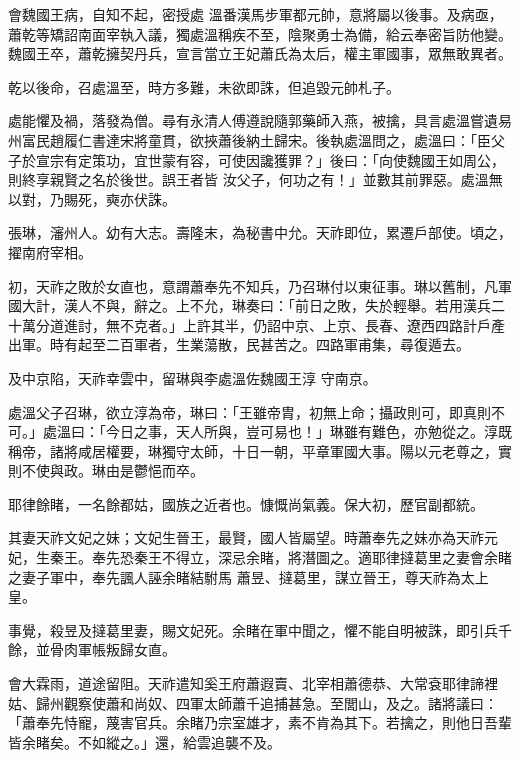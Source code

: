 \begin{pinyinscope}
 會魏國王病，自知不起，密授處
 溫番漢馬步軍都元帥，意將屬以後事。及病亟，蕭乾等矯詔南面宰執入議，獨處溫稱疾不至，陰聚勇士為備，給云奉密旨防他變。魏國王卒，蕭乾擁契丹兵，宣言當立王妃蕭氏為太后，權主軍國事，眾無敢異者。



 乾以後命，召處溫至，時方多難，未欲即誅，但追毀元帥札子。



 處能懼及禍，落發為僧。尋有永清人傅遵說隨郭藥師入燕，被擒，具言處溫嘗遺易州富民趙履仁書達宋將童貫，欲挾蕭後納土歸宋。後執處溫問之，處溫曰：「臣父子於宣宗有定策功，宜世蒙有容，可使因讒獲罪？」後曰：「向使魏國王如周公，則終享親賢之名於後世。誤王者皆
 汝父子，何功之有！」並數其前罪惡。處溫無以對，乃賜死，奭亦伏誅。



 張琳，瀋州人。幼有大志。壽隆末，為秘書中允。天祚即位，累遷戶部使。頃之，擢南府宰相。



 初，天祚之敗於女直也，意謂蕭奉先不知兵，乃召琳付以東征事。琳以舊制，凡軍國大計，漢人不與，辭之。上不允，琳奏曰：「前日之敗，失於輕舉。若用漢兵二十萬分道進討，無不克者。」上許其半，仍詔中京、上京、長春、遼西四路計戶產出軍。時有起至二百軍者，生業蕩散，民甚苦之。四路軍甫集，尋復遁去。



 及中京陷，天祚幸雲中，留琳與李處溫佐魏國王淳
 守南京。



 處溫父子召琳，欲立淳為帝，琳曰：「王雖帝胄，初無上命；攝政則可，即真則不可。」處溫曰：「今日之事，天人所與，豈可易也！」琳雖有難色，亦勉從之。淳既稱帝，諸將咸居權要，琳獨守太師，十日一朝，平章軍國大事。陽以元老尊之，實則不使與政。琳由是鬱悒而卒。



 耶律餘睹，一名餘都姑，國族之近者也。慷慨尚氣義。保大初，歷官副都統。



 其妻天祚文妃之妹；文妃生晉王，最賢，國人皆屬望。時蕭奉先之妹亦為天祚元妃，生秦王。奉先恐秦王不得立，深忌余睹，將潛圖之。適耶律撻葛里之妻會余睹之妻子軍中，奉先諷人誣余睹結駙馬
 蕭昱、撻葛里，謀立晉王，尊天祚為太上皇。



 事覺，殺昱及撻葛里妻，賜文妃死。余睹在軍中聞之，懼不能自明被誅，即引兵千餘，並骨肉軍帳叛歸女直。



 會大霖雨，道途留阻。天祚遣知奚王府蕭遐賣、北宰相蕭德恭、大常袞耶律諦裡姑、歸州觀察使蕭和尚奴、四軍太師蕭千追捕甚急。至閭山，及之。諸將議曰：「蕭奉先恃寵，蔑害官兵。余睹乃宗室雄才，素不肯為其下。若擒之，則他日吾輩皆余睹矣。不如縱之。」還，給雲追襲不及。




\end{pinyinscope}
